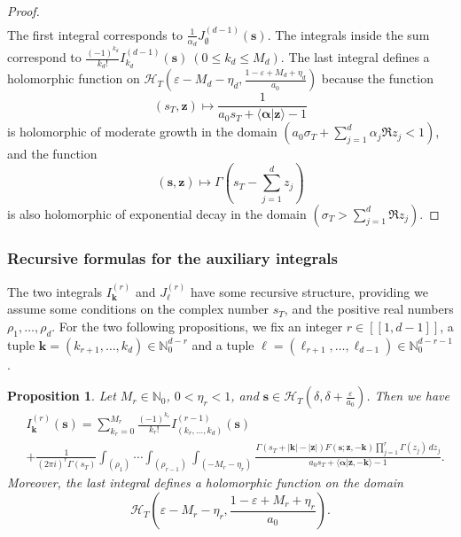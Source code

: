 \documentclass[a4paper,12pt]{article}
\newtheorem{prop}[thm]{Proposition}
\theoremstyle{definition}
\numberwithin{equation}{section}
\newcommand{\dd}{d}
\newcommand{\ii}{i}
\begin{document}
\begin{proof}
\begin{align*}
\end{align*}
The first integral corresponds to $\frac{1}{\alpha_d} J^{(d-1)}_{\emptyset}(\mathbf{s})$. The integrals inside the sum correspond to $\frac{(-1)^{k_d}}{k_d!}I^{(d-1)}_{k_d}(\mathbf{s}) \ (0 \leq k_d \leq M_d)$. The last integral defines a holomorphic function on $\mathcal{H}_T(\varepsilon-M_d-\eta_d,\frac{1-\varepsilon+M_d+\eta_d}{a_0})$ because the function
$$ (s_T, \mathbf{z}) \mapsto \frac{1}{a_0s_T+\langle \boldsymbol{\alpha}|\mathbf{z} \rangle -1} $$
is holomorphic of moderate growth in the domain $(a_0\sigma_T+\sum_{j=1}^d \alpha_j \Re z_j<1)$, and the function 
$$(\mathbf{s},\mathbf{z}) \mapsto \Gamma\left(s_T-\sum_{j=1}^d z_j\right)$$ 
is also holomorphic of exponential decay in the domain $(\sigma_T>\sum_{j=1}^d \Re z_j)$.
\end{proof}

\subsubsection{Recursive formulas for the auxiliary integrals}

The two integrals $I^{(r)}_{\mathbf{k}}$ and $J^{(r)}_{\boldsymbol{\ell}}$ have some recursive structure, providing we assume some conditions on the complex number $s_T$, and the positive real numbers $\rho_1,\ldots,\rho_d$. For the two following propositions, we fix an integer $r \in [\![1,d-1]\!]$, a tuple $\mathbf{k}=(k_{r+1},\ldots,k_d) \in \mathbb{N}_0^{d-r}$ and a tuple $\boldsymbol{\ell}=(\ell_{r+1},\ldots,\ell_{d-1}) \in \mathbb{N}_0^{d-r-1}$.

\begin{prop}
\label{prop:iterative_structure_I_r}
Let $M_r \in \mathbb{N}_0$, $0<\eta_r<1$, and $\mathbf{s} \in \mathcal{H}_T(\delta,\delta+\frac{\varepsilon}{a_0})$. Then we have
\begin{align*}
    &I^{(r)}_{\mathbf{k}}(\mathbf{s})=\sum_{k_r=0}^{M_r}\frac{(-1)^{k_r}}{k_r!}I^{(r-1)}_{(k_r,\ldots,k_d)}(\mathbf{s}) \\
    &+\frac{1}{(2\pi \ii)^r\Gamma(s_T)} \int_{(\rho_{1})} \cdots \int_{(\rho_{r-1})} \int_{(-M_r-\eta_r)} \frac{\Gamma(s_T+|\mathbf{k}|-|\mathbf{z}|)F(\mathbf{s};\mathbf{z},-\mathbf{k}) \prod_{j=1}^r \Gamma(z_j) \, \dd z_j}{a_0s_T+\langle \boldsymbol{\alpha}|\mathbf{z},-\mathbf{k} \rangle -1}.
\end{align*}
Moreover, the last integral defines a holomorphic function on the domain
$$ \mathcal{H}_T\left(\varepsilon-M_r-\eta_r,\frac{1-\varepsilon+M_r+\eta_r}{a_0}\right). $$
\end{prop}
\end{document}
